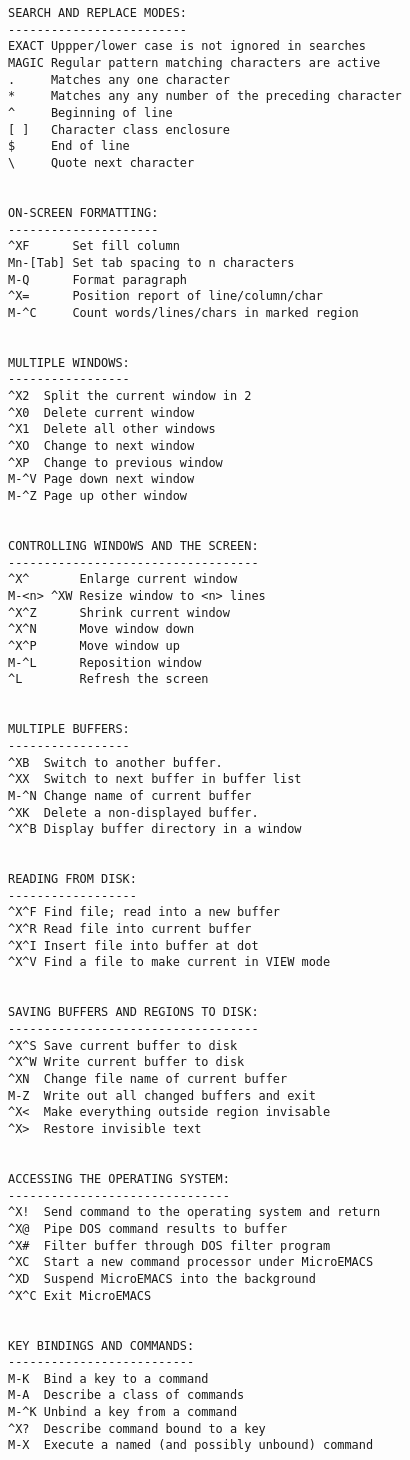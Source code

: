 \begin{verbatim}
SEARCH AND REPLACE MODES:
-------------------------
EXACT Uppper/lower case is not ignored in searches
MAGIC Regular pattern matching characters are active
.     Matches any one character
*     Matches any any number of the preceding character
^     Beginning of line 
[ ]   Character class enclosure
$     End of line 
\     Quote next character


ON-SCREEN FORMATTING:
---------------------
^XF      Set fill column
Mn-[Tab] Set tab spacing to n characters
M-Q      Format paragraph
^X=      Position report of line/column/char
M-^C     Count words/lines/chars in marked region


MULTIPLE WINDOWS:
-----------------
^X2  Split the current window in 2 
^X0  Delete current window         
^X1  Delete all other windows      
^XO  Change to next window
^XP  Change to previous window
M-^V Page down next window
M-^Z Page up other window


CONTROLLING WINDOWS AND THE SCREEN:
-----------------------------------
^X^       Enlarge current window 
M-<n> ^XW Resize window to <n> lines
^X^Z      Shrink current window
^X^N      Move window down
^X^P      Move window up
M-^L      Reposition window
^L        Refresh the screen


MULTIPLE BUFFERS:
-----------------
^XB  Switch to another buffer.
^XX  Switch to next buffer in buffer list
M-^N Change name of current buffer
^XK  Delete a non-displayed buffer.
^X^B Display buffer directory in a window


READING FROM DISK:
------------------
^X^F Find file; read into a new buffer
^X^R Read file into current buffer
^X^I Insert file into buffer at dot
^X^V Find a file to make current in VIEW mode


SAVING BUFFERS AND REGIONS TO DISK:
-----------------------------------
^X^S Save current buffer to disk
^X^W Write current buffer to disk
^XN  Change file name of current buffer
M-Z  Write out all changed buffers and exit 
^X<  Make everything outside region invisable
^X>  Restore invisible text


ACCESSING THE OPERATING SYSTEM:
-------------------------------
^X!  Send command to the operating system and return
^X@  Pipe DOS command results to buffer
^X#  Filter buffer through DOS filter program
^XC  Start a new command processor under MicroEMACS
^XD  Suspend MicroEMACS into the background
^X^C Exit MicroEMACS


KEY BINDINGS AND COMMANDS:
--------------------------
M-K  Bind a key to a command
M-A  Describe a class of commands
M-^K Unbind a key from a command
^X?  Describe command bound to a key
M-X  Execute a named (and possibly unbound) command


\end{verbatim}
